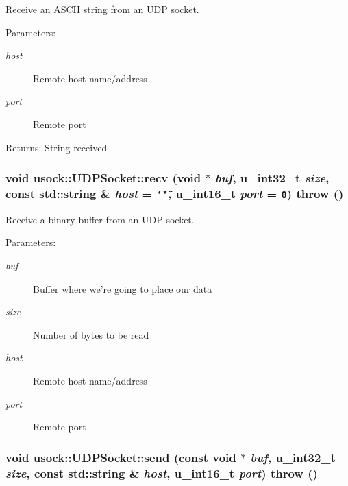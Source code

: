 Receive an ASCII string from an UDP socket. 

\begin{Desc}
\item[Parameters:]
\begin{description}
\item[{\em host}]Remote host name/address \item[{\em port}]Remote port \end{description}
\end{Desc}
\begin{Desc}
\item[Returns:]String received \end{Desc}
\hypertarget{classusock_1_1UDPSocket_a3ffe1666074dc785e0c70e0d36c9bf4}{
\subsubsection[{recv}]{\setlength{\rightskip}{0pt plus 5cm}void usock::UDPSocket::recv (void $\ast$ {\em buf}, \/  u\_\-int32\_\-t {\em size}, \/  const std::string \& {\em host} = {\tt \char`\"{}\char`\"{}}, \/  u\_\-int16\_\-t {\em port} = {\tt 0})  throw ()}}
\label{classusock_1_1UDPSocket_a3ffe1666074dc785e0c70e0d36c9bf4}


Receive a binary buffer from an UDP socket. 

\begin{Desc}
\item[Parameters:]
\begin{description}
\item[{\em buf}]Buffer where we're going to place our data \item[{\em size}]Number of bytes to be read \item[{\em host}]Remote host name/address \item[{\em port}]Remote port \end{description}
\end{Desc}
\hypertarget{classusock_1_1UDPSocket_49d2828223835e216fdee794519b00e7}{
\subsubsection[{send}]{\setlength{\rightskip}{0pt plus 5cm}void usock::UDPSocket::send (const void $\ast$ {\em buf}, \/  u\_\-int32\_\-t {\em size}, \/  const std::string \& {\em host}, \/  u\_\-int16\_\-t {\em port})  throw ()}}
\label{classusock_1_1UDPSocket_49d2828223835e216fdee794519b00e7}


